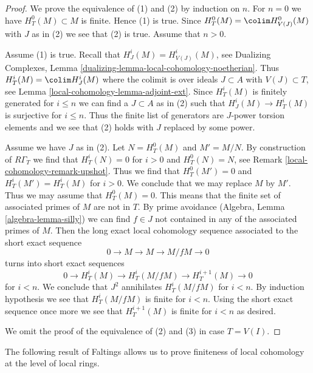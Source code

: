 \begin{proof}
We prove the equivalence of (1) and (2) by induction on $n$.
For $n = 0$ we have $H^0_T(M) \subset M$ is finite. Hence (1) is true.
Since $H^0_T(M) = \colim H^0_{V(J)}(M)$ with $J$ as in (2) we see
that (2) is true. Assume that $n > 0$.

\medskip\noindent
Assume (1) is true. Recall that $H^i_J(M) = H^i_{V(J)}(M)$, see
Dualizing Complexes, Lemma \ref{dualizing-lemma-local-cohomology-noetherian}.
Thus $H^i_T(M) = \colim H^i_J(M)$ where the colimit is over ideals
$J \subset A$ with $V(J) \subset T$, see
Lemma \ref{local-cohomology-lemma-adjoint-ext}. Since $H^i_T(M)$ is finitely generated
for $i \leq n$ we can find a $J \subset A$ as in (2) such that
$H^i_J(M) \to H^i_T(M)$ is surjective for $i \leq n$.
Thus the finite list of generators are $J$-power torsion elements
and we see that (2) holds with $J$ replaced by some power.

\medskip\noindent
Assume we have $J$ as in (2). Let $N = H^0_T(M)$ and $M' = M/N$.
By construction of $R\Gamma_T$ we find that
$H^i_T(N) = 0$ for $i > 0$ and $H^0_T(N) = N$, see
Remark \ref{local-cohomology-remark-upshot}. Thus we find that
$H^0_T(M') = 0$ and $H^i_T(M') = H^i_T(M)$ for $i > 0$.
We conclude that we may replace $M$ by $M'$.
Thus we may assume that $H^0_T(M) = 0$.
This means that the finite set of associated primes of $M$
are not in $T$. By prime avoidance (Algebra, Lemma \ref{algebra-lemma-silly})
we can find $f \in J$ not contained in any of the associated primes of $M$.
Then the long exact local cohomology sequence associated to the short
exact sequence
$$
0 \to M \to M \to M/fM \to 0
$$
turns into short exact sequences
$$
0 \to H^i_T(M) \to H^i_T(M/fM) \to H^{i + 1}_T(M) \to 0
$$
for $i < n$. We conclude that $J^2$ annihilates $H^i_T(M/fM)$
for $i < n$. By induction hypothesis we see that $H^i_T(M/fM)$
is finite for $i < n$. Using the short exact sequence once more
we see that $H^{i + 1}_T(M)$ is finite for $i < n$ as desired.

\medskip\noindent
We omit the proof of the equivalence of (2) and (3)
in case $T = V(I)$.
\end{proof}

The following result of Faltings allows us to prove finiteness
of local cohomology at the level of local rings.

